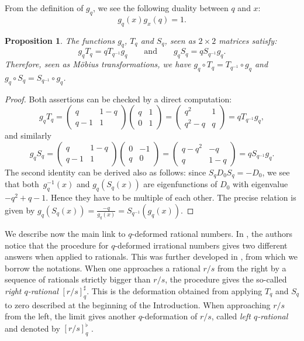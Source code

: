\documentclass[pdftex]{sigma}
\numberwithin{equation}{section}
\newtheorem{Proposition}[Theorem]{Proposition}
 { \theoremstyle{definition}
\newtheorem{Definition}[Theorem]{Definition}
\newtheorem{Note}[Theorem]{Note}
\newtheorem{Example}[Theorem]{Example}
\newtheorem{Remark}[Theorem]{Remark} }
\begin{document}
From the definition of $g_q$, we see the following duality between $q$ and $x$:
\[
g_q(x)g_x(q)=1.\]

\begin{Proposition}\label{Prop:qg-Tq-Sq}
The functions $g_q$, $T_q$ and $S_q$, seen as $2\times 2$ matrices satisfy:
\[
g_qT_q=qT_{q^{-1}}g_q \qquad \text{and}\qquad g_qS_q=qS_{q^{-1}}g_q.
\]
Therefore, seen as M\"obius transformations, we have $g_q\circ T_q = T_{q^{-1}}\circ g_q$ and $g_q\circ S_q = S_{q^{-1}}\circ g_q$.
\end{Proposition}
\begin{proof}
Both assertions can be checked by a direct computation:
\[
g_qT_q=\begin{pmatrix}q & 1-q\\q-1 & 1 \end{pmatrix}\begin{pmatrix}q & 1\\0 & 1 \end{pmatrix}=\begin{pmatrix}q^2 & 1\\q^2-q & q \end{pmatrix}=qT_{q^{-1}}g_q,
\]
and similarly
\[
g_qS_q=\begin{pmatrix}q & 1-q\\q-1 & 1 \end{pmatrix}\begin{pmatrix}0 & -1\\q & 0 \end{pmatrix}=\begin{pmatrix}q-q^2 & -q\\q & 1-q \end{pmatrix}=qS_{q^{-1}}g_q.
\]
The second identity can be derived also as follows: since $S_qD_0S_q=-D_0$, we see that both~$g_q^{-1}(x)$ and $g_q(S_q(x))$ are eigenfunctions of $D_0$ with eigenvalue $-q^2+q-1$. Hence they have to be multiple of each other. The precise relation is given by $g_q(S_q(x))=\tfrac{-q}{g_q(x)}=S_{q^{-1}}(g_q(x))$.
\end{proof}

We describe now the main link to $q$-deformed rational numbers. In \cite[Remark 3.2]{morier2022q}, the authors notice that the procedure for $q$-deformed irrational numbers gives two different answers when applied to rationals. This was further developed in \cite{bapat2023q}, from which we borrow the notations. When one approaches a rational $r/s$ from the right by a sequence of rationals strictly bigger than $r/s$, the procedure gives the so-called \emph{right $q$-rational} $[r/s]_q^\sharp$. This is the deformation obtained from applying $T_q$ and $S_q$ to zero described at the beginning of the Introduction. When approaching $r/s$ from the left, the limit gives another $q$-deformation of $r/s$, called \emph{left $q$-rational} and denoted by $[r/s]_q^\flat$ \cite[Theorem~2.11]{bapat2023q}.
\end{document}
